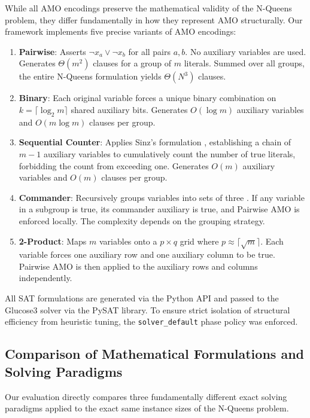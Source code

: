 While all AMO encodings preserve the mathematical validity of the N-Queens problem, they differ fundamentally in how they represent AMO structurally. Our framework implements five precise variants of AMO encodings:
\begin{enumerate}
\item \textbf{Pairwise}: Asserts $\neg x_a \vee \neg x_b$ for all pairs $a, b$. No auxiliary variables are used. Generates $\Theta(m^2)$ clauses for a group of $m$ literals. Summed over all groups, the entire N-Queens formulation yields $\Theta(N^3)$ clauses.
\item \textbf{Binary}: Each original variable forces a unique binary combination on $k = \lceil \log_2 m \rceil$ shared auxiliary bits. Generates $O(\log m)$ auxiliary variables and $O(m \log m)$ clauses per group.
\item \textbf{Sequential Counter}: Applies Sinz's formulation \citep{sinz2005towards}, establishing a chain of $m-1$ auxiliary variables to cumulatively count the number of true literals, forbidding the count from exceeding one. Generates $O(m)$ auxiliary variables and $O(m)$ clauses per group.
\item \textbf{Commander}: Recursively groups variables into sets of three \citep{frisch2005sat}. If any variable in a subgroup is true, its commander auxiliary is true, and Pairwise AMO is enforced locally. The complexity depends on the grouping strategy.
\item \textbf{2-Product}: Maps $m$ variables onto a $p \times q$ grid where $p \approx \lceil \sqrt{m} \rceil$. Each variable forces one auxiliary row and one auxiliary column to be true. Pairwise AMO is then applied to the auxiliary rows and columns independently.
\end{enumerate}

All SAT formulations are generated via the Python API and passed to the Glucose3 solver \citep{audemard2009predicting} via the PySAT library. To ensure strict isolation of structural efficiency from heuristic tuning, the \texttt{solver\_default} phase policy was enforced.

\subsection{Comparison of Mathematical Formulations and Solving Paradigms}
Our evaluation directly compares three fundamentally different exact solving paradigms applied to the exact same instance sizes of the N-Queens problem.

